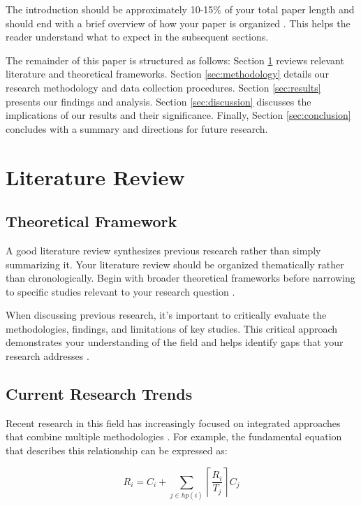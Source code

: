 \documentclass[11pt]{article}
\begin{document}
The introduction should be approximately 10-15\% of your total paper length and should end with a brief overview of how your paper is organized \cite{jones2019research}. This helps the reader understand what to expect in the subsequent sections.

The remainder of this paper is structured as follows: Section \ref{sec:literature} reviews relevant literature and theoretical frameworks. Section \ref{sec:methodology} details our research methodology and data collection procedures. Section \ref{sec:results} presents our findings and analysis. Section \ref{sec:discussion} discusses the implications of our results and their significance. Finally, Section \ref{sec:conclusion} concludes with a summary and directions for future research.

\section{Literature Review}
\label{sec:literature}

\subsection{Theoretical Framework}

A good literature review synthesizes previous research rather than simply summarizing it. Your literature review should be organized thematically rather than chronologically. Begin with broader theoretical frameworks before narrowing to specific studies relevant to your research question \cite{wilson2021theoretical}.

When discussing previous research, it's important to critically evaluate the methodologies, findings, and limitations of key studies. This critical approach demonstrates your understanding of the field and helps identify gaps that your research addresses \cite{brown2018review}.

\subsection{Current Research Trends}

Recent research in this field has increasingly focused on integrated approaches that combine multiple methodologies \cite{taylor2022integration}. For example, the fundamental equation that describes this relationship can be expressed as:

\begin{equation}
R_i = C_i + \sum_{j \in hp(i)} \left\lceil\frac{R_i}{T_j}\right\rceil C_j
\end{equation}
\end{document}
